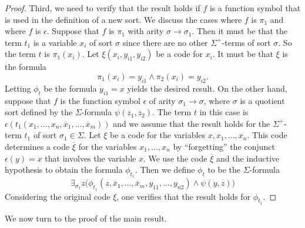 \begin{proof}
Third, we need to verify that the result holds if $f$ is a function
symbol that is used in the definition of a new sort. We discuss the
cases where $f$ is $\pi_1$ and where $f$ is $\epsilon$. Suppose that
$f$ is $\pi_1$ with arity $\sigma\rightarrow\sigma_1$. Then it must be
that the term $t_1$ is a variable $x_i$ of sort $\sigma$ since there
are no other $\Sigma^+$-terms of sort $\sigma$. So the term $t$ is
$\pi_1(x_i)$. Let $\xi(x_i, y_{i1}, y_{i2})$ be a code for $x_i$. It
must be that $\xi$ is the formula
\[  \pi_1(x_i)=y_{i1}\land\pi_2(x_i)=y_{i2} . \]
Letting $\phi_t$ be the formula $y_{i1}=x$ yields the desired
result. On the other hand, suppose that $f$ is the function symbol
$\epsilon$ of arity $\sigma_1\rightarrow\sigma$, where $\sigma$ is a
quotient sort defined by the $\Sigma$-formula $\psi(z_1, z_2)$. The
term $t$ in this case is
$\epsilon(t_1(x_1,\ldots, x_n, \overline{x}_1,\ldots,
\overline{x}_m))$ and we assume that the result holds for the
$\Sigma^+$-term $t_1$ of sort $\sigma_1\in\Sigma$. Let $\xi$ be a code
for the variables $x, x_1,\ldots, x_n$. This code determines a code
$\overline{\xi}$ for the variables $x_1,\ldots, x_n$ by ``forgetting''
the conjunct $\epsilon(y)=x$ that involves the variable $x$. We use
the code $\overline{\xi}$ and the inductive hypothesis to obtain the
formula $\phi_{t_1}$. Then we define $\phi_t$ to be the
$\Sigma$-formula
\[ \exists_{\sigma_1} z\big(\phi_{t_1}(z, \overline{x}_1,\ldots,
\overline{x}_m, y_{11},\ldots, y_{n2})\land\psi(y, z)\big) \]
Considering the original code $\xi$, one verifies that the result holds for $\phi_{t_1}$.
\end{proof}

We now turn to the proof of the main result.


